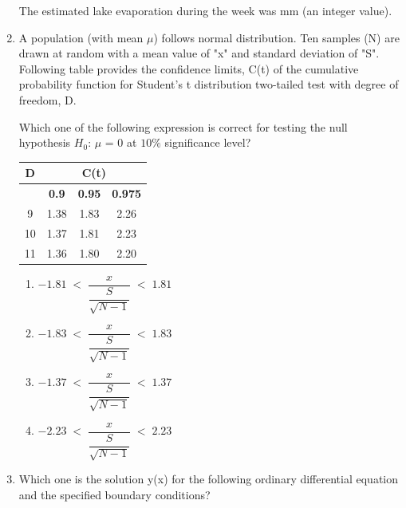 \documentclass[journal]{IEEEtran}
\numberwithin{equation}{enumi}
\numberwithin{figure}{enumi}
\begin{document}
\begin{enumerate}[start=1, label={Q\arabic*.}]
\vspace{0.1cm}
The estimated lake evaporation during the week was \underline{\hspace{1.5cm}} mm (an integer value).
\vspace{0.1cm}
\item A population (with mean $\mu$) follows normal distribution. Ten samples (N) are drawn
at random with a mean value of "x" and standard deviation of "S". Following table
provides the confidence limits, C(t) of the cumulative probability function for
Student's t distribution two-tailed test with degree of freedom, D.

\vspace{0.1cm}
Which one of the following expression is correct for testing the null hypothesis
$H_0$: $\mu$ = $0$ at $10\%$ significance level?
\begin{table}[H]
\centering
\begin{tabular}{|c|c|c|c|}
\hline
\textbf{D} & \multicolumn{3}{c|}{\textbf{C(t)}} \\ \hline
 & \textbf{0.9} & \textbf{0.95} & \textbf{0.975} \\ \hline
9  & 1.38 & 1.83 & 2.26 \\ \hline
10 & 1.37 & 1.81 & 2.23 \\ \hline
11 & 1.36 & 1.80 & 2.20 \\ \hline
\end{tabular}
\end{table}
\begin{enumerate} 
    \item $-1.81 \;<\; \dfrac{x}{\dfrac{S}{\sqrt{N-1}}} \;<\; 1.81$
    \item $-1.83 \;<\; \dfrac{x}{\dfrac{S}{\sqrt{N-1}}} \;<\; 1.83$
    \item $-1.37 \;<\; \dfrac{x}{\dfrac{S}{\sqrt{N-1}}} \;<\; 1.37$
    \item $-2.23 \;<\; \dfrac{x}{\dfrac{S}{\sqrt{N-1}}} \;<\; 2.23$
\end{enumerate}
\newpage
\item Which one is the solution y(x) for the following ordinary differential equation and the
specified boundary conditions?
  

\end{enumerate}
\end{document}
